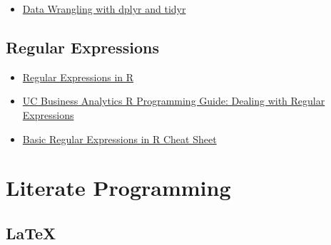 \documentclass[]{book}
\providecommand{\tightlist}{%
  \setlength{\itemsep}{0pt}\setlength{\parskip}{0pt}}
\begin{document}
\begin{itemize}
\tightlist
\item
  \href{https://www.rstudio.com/wp-content/uploads/2015/02/data-wrangling-cheatsheet.pdf}{Data Wrangling with dplyr and tidyr}
\end{itemize}

\hypertarget{regular-expressions}{%
\section{Regular Expressions}\label{regular-expressions}}

\begin{itemize}
\item
  \href{https://stringr.tidyverse.org/articles/regular-expressions.html}{Regular Expressions in R}
\item
  \href{http://uc-r.github.io/regex}{UC Business Analytics R Programming Guide: Dealing with Regular Expressions}
\item
  \href{https://www.rstudio.com/wp-content/uploads/2016/09/RegExCheatsheet.pdf}{Basic Regular Expressions in R Cheat Sheet}
\end{itemize}

\hypertarget{literate-programming}{%
\chapter*{Literate Programming}\label{literate-programming}}

\hypertarget{latex}{%
\section{LaTeX}\label{latex}}
\end{document}
